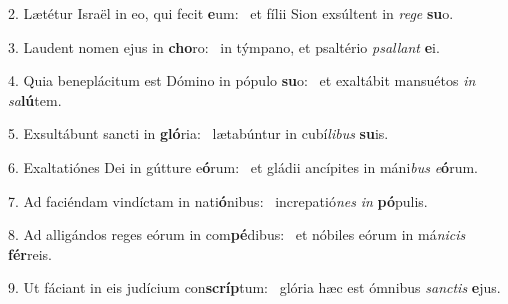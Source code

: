 2. Lætétur Israël in eo, qui fecit \textbf{e}um: \ast\  et fílii Sion exsúltent in \textit{re}\textit{ge} \textbf{su}o.\

3. Laudent nomen ejus in \textbf{cho}ro: \ast\  in týmpano, et psaltério \textit{psal}\textit{lant} \textbf{e}i.\

4. Quia beneplácitum est Dómino in pópulo \textbf{su}o: \ast\  et exaltábit mansuétos \textit{in} \textit{sa}\textbf{lú}tem.\

5. Exsultábunt sancti in \textbf{gló}ria: \ast\  lætabúntur in cubí\textit{li}\textit{bus} \textbf{su}is.\

6. Exaltatiónes Dei in gútture e\textbf{ó}rum: \ast\  et gládii ancípites in máni\textit{bus} \textit{e}\textbf{ó}rum.\

7. Ad faciéndam vindíctam in nati\textbf{ó}nibus: \ast\  increpatió\textit{nes} \textit{in} \textbf{pó}pulis.\

8. Ad alligándos reges eórum in com\textbf{pé}dibus: \ast\  et nóbiles eórum in má\textit{ni}\textit{cis} \textbf{fér}reis.\

9. Ut fáciant in eis judícium con\textbf{scríp}tum: \ast\  glória hæc est ómnibus \textit{sanc}\textit{tis} \textbf{e}jus.\

